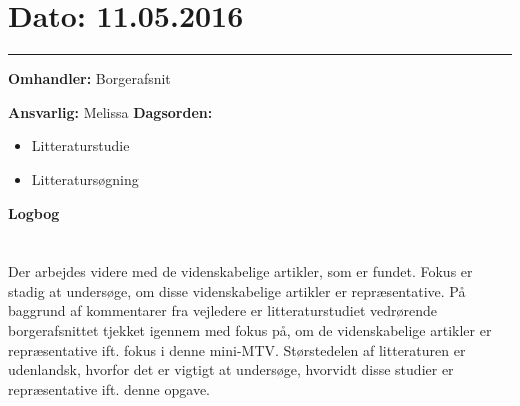 

\section{Dato: 11.05.2016}
\hrule

\textbf{Omhandler:} Borgerafsnit 

\textbf{Ansvarlig:} Melissa
\textbf{Dagsorden:}
\begin{itemize}
	\item Litteraturstudie
	\item Litteratursøgning 
\end{itemize}

\textbf{Logbog}
\\
\\ \\
Der arbejdes videre med de videnskabelige artikler, som er fundet. Fokus er stadig at undersøge, om disse videnskabelige artikler er repræsentative. 
På baggrund af kommentarer fra vejledere er litteraturstudiet vedrørende borgerafsnittet tjekket igennem med fokus på, om de videnskabelige artikler er repræsentative ift. fokus i denne mini-MTV. Størstedelen af litteraturen er udenlandsk, hvorfor det er vigtigt at undersøge, hvorvidt disse studier er repræsentative ift. denne opgave.